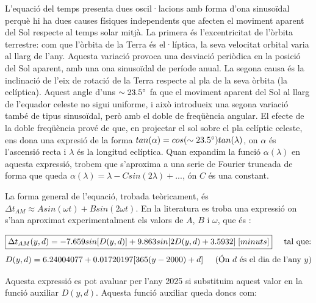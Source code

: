 \documentclass[a4paper, 11pt]{article}
\begin{document}
\vspace{2mm}

\noindent L’equació del temps presenta dues oscil·lacions amb forma d’ona sinusoïdal perquè hi ha dues causes físiques independents que afecten el moviment aparent del Sol respecte al temps solar mitjà. La primera és l’excentricitat de l’òrbita terrestre: com que l’òrbita de la Terra és el·líptica, la seva velocitat orbital varia al llarg de l’any. Aquesta variació provoca una desviació periòdica en la posició del Sol aparent, amb una ona sinusoïdal de període anual. La segona causa és la inclinació de l’eix de rotació de la Terra respecte al pla de la seva òrbita (la eclíptica). Aquest angle d’uns $\sim 23.5\degree$ fa que el moviment aparent del Sol al llarg de l’equador celeste no sigui uniforme, i això introdueix una segona variació també de tipus sinusoïdal, però amb el doble de freqüència angular. El efecte de la doble freqüència prové de que, en projectar el sol sobre el pla eclíptic celeste, ens dona una expresió de la forma $tan(\alpha) = cos(\sim 23.5 \degree) tan(\lambda)$, on $\alpha$ és l'ascensió recta i $\lambda$ és la longitud eclíptica. Quan expandim la funció $\alpha(\lambda)$ en aquesta expressió, trobem que s'aproxima a una serie de Fourier truncada de forma que queda $\alpha(\lambda) = \lambda - Csin(2\lambda) + ...$, ón $C$ és una constant.

\vspace{2mm}

\noindent La forma general de l'equació, trobada teòricament, és $\Delta t_{AM} \approx Asin(\omega t) + Bsin(2\omega t)$. En la literatura es troba una expressió on s'han aproximat experimentalment els valors de $A$, $B$ i $\omega$, que és \cite{EQ_OF_TIME}:

\begin{equation} \label{eq_time}
    \boxed{\Delta t_{AM}(y,d) = -7.659sin[D(y,d)] + 9.863 sin[2D(y,d) + 3.5932] \hspace{1mm} [minuts]} \hspace{5mm} \text{tal que:}
\end{equation}
\begin{equation*}
    D(y,d) = 6.24004077 + 0.01720197[365(y-2000) + d] \hspace{5mm} \text{(Ón $d$ és el dia de l'any $y$)}
\end{equation*}
\vspace{2mm}

\noindent Aquesta expressió es pot avaluar per l'any 2025 si substituim aquest valor en la funció auxiliar $D(y,d)$. Aquesta funció auxiliar queda doncs com:
\end{document}
